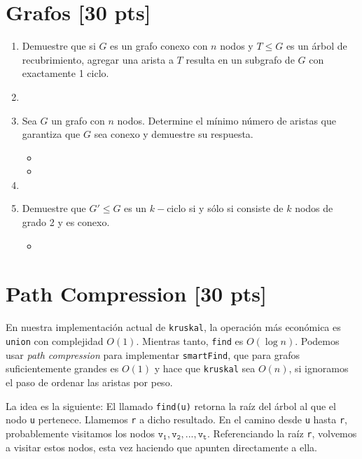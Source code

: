 \section{Grafos [\textbf{30 pts}]}
\begin{enumerate}
	\item Demuestre que si $G$ es un grafo conexo con $n$ nodos y $T \leq G$ es un árbol de recubrimiento, agregar una arista a $T$ resulta en un subgrafo de $G$ con exactamente 1 ciclo.
    \item[] 
    \item Sea $G$ un grafo con $n$ nodos. Determine el mínimo número de aristas que garantiza que $G$ sea conexo y demuestre su respuesta. \begin{itemize}
        \item[] [\emph{Ayuda:} Haga muchos dibujos empezando con poquitos nodos, y agregue aristas evitando que sea conexo.]
        \item[]
    \end{itemize}
    \item[] 
    \item Demuestre que $G' \leq G$ es un $k-$ciclo si y sólo si consiste de $k$ nodos de grado 2 y es conexo.
        \begin{itemize}
            \item[] [\emph{Ayuda:} Use el principio del palomar.]
        \end{itemize}
\end{enumerate}

\section{Path Compression [\textbf{30 pts}]} 
En nuestra implementación actual de \texttt{kruskal}, la operación más económica es \texttt{union} con complejidad $O(1)$. Mientras tanto, \texttt{find} es $O(\log n)$. Podemos usar \emph{path compression} para implementar \texttt{smartFind}, que para grafos suficientemente grandes es $O(1)$ y hace que \texttt{kruskal} sea $O(n)$, si ignoramos el paso de ordenar las aristas por peso.

La idea es la siguiente: El llamado \texttt{find(u)} retorna la raíz del árbol al que el nodo \texttt{u} pertenece. Llamemos \texttt{r} a dicho resultado. En el camino desde \texttt{u} hasta \texttt{r}, probablemente visitamos los nodos $\mathtt{v_1, v_2,..., v_t}$. Referenciando la raíz \texttt{r}, volvemos a visitar estos nodos, esta vez haciendo que apunten directamente a ella.


